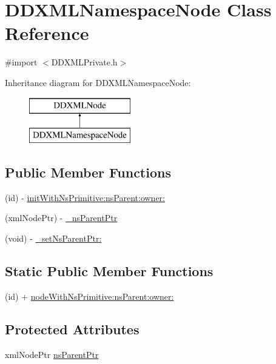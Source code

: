\hypertarget{class_d_d_x_m_l_namespace_node}{
\section{DDXMLNamespaceNode Class Reference}
\label{class_d_d_x_m_l_namespace_node}
}


{\ttfamily \#import $<$DDXMLPrivate.h$>$}

Inheritance diagram for DDXMLNamespaceNode:\begin{figure}[H]
\begin{center}
\leavevmode
\includegraphics[height=2cm]{class_d_d_x_m_l_namespace_node}
\end{center}
\end{figure}
\subsection*{Public Member Functions}
\begin{DoxyCompactItemize}
\item 
(id) -\/ \hyperlink{class_d_d_x_m_l_namespace_node_a308384523e2f14d5640ababa5a945326}{initWithNsPrimitive:nsParent:owner:}
\item 
(xmlNodePtr) -\/ \hyperlink{class_d_d_x_m_l_namespace_node_a30f290015a446f18fb9c4c3e0dad9554}{\_\-nsParentPtr}
\item 
(void) -\/ \hyperlink{class_d_d_x_m_l_namespace_node_a1bbfe55192dcea58063347642356592f}{\_\-setNsParentPtr:}
\end{DoxyCompactItemize}
\subsection*{Static Public Member Functions}
\begin{DoxyCompactItemize}
\item 
(id) + \hyperlink{class_d_d_x_m_l_namespace_node_a38a7907e13c71da18d55662d21ca70fa}{nodeWithNsPrimitive:nsParent:owner:}
\end{DoxyCompactItemize}
\subsection*{Protected Attributes}
\begin{DoxyCompactItemize}
\item 
xmlNodePtr \hyperlink{class_d_d_x_m_l_namespace_node_aa06097214d369b66af226112ca1248a2}{nsParentPtr}
\end{DoxyCompactItemize}


